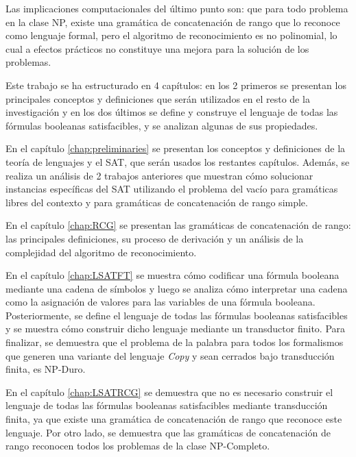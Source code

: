 \documentclass[12pt]{article}
\begin{document}
Las implicaciones computacionales del último punto son: que para todo problema en la clase NP, existe una gramática
de concatenación de rango que lo reconoce como lenguaje formal, pero el algoritmo de reconocimiento es no 
polinomial, lo cual a efectos prácticos no constituye una mejora para la solución de los problemas.

Este trabajo se ha estructurado en 4 capítulos: en los 2 primeros se presentan los principales conceptos y 
definiciones que serán utilizados en el resto de la investigación y en los dos últimos se define y construye 
el lenguaje de todas las fórmulas booleanas satisfacibles, y se analizan algunas de sus propiedades.

En el capítulo \ref{chap:preliminaries} se presentan los conceptos y definiciones de la teoría de lenguajes y 
el SAT, que serán usados los restantes capítulos. Además, se realiza un análisis de 2 trabajos anteriores 
que muestran cómo solucionar instancias específicas del SAT utilizando el problema del vacío para gramáticas 
libres del contexto y para gramáticas de concatenación de rango simple.

En el capítulo \ref{chap:RCG} se presentan las gramáticas de concatenación de rango: las principales definiciones, 
su proceso de derivación y un análisis de la complejidad del algoritmo de reconocimiento.

En el capítulo \ref{chap:LSATFT} se muestra cómo codificar una fórmula booleana mediante una cadena de símbolos 
y luego se analiza cómo interpretar una cadena como la asignación de valores para las variables de una fórmula 
booleana.  Posteriormente, se define el lenguaje de todas las fórmulas booleanas satisfacibles y se muestra 
cómo construir dicho lenguaje mediante un transductor finito. Para finalizar, se demuestra que el problema de 
la palabra para todos los formalismos que generen una variante del lenguaje \textit{Copy} y sean cerrados bajo
transducción finita, es NP-Duro.

En el capítulo \ref{chap:LSATRCG} se demuestra que no es necesario construir el lenguaje de todas las 
fórmulas booleanas satisfacibles mediante transducción finita, ya que existe una gramática de concatenación 
de rango que reconoce este lenguaje. Por otro lado, se demuestra que las gramáticas de concatenación de rango 
reconocen todos los problemas de la clase NP-Completo.
\end{document}
